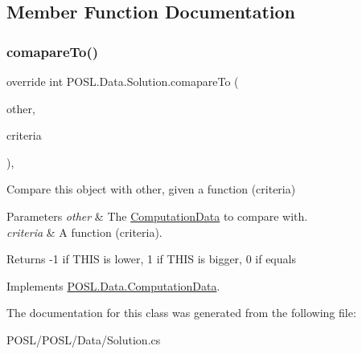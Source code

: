 \subsection{Member Function Documentation}
\mbox{\label{classPOSL_1_1Data_1_1Solution_a17d810433104964cc43bf65f35d25cc7}} 
\subsubsection{\texorpdfstring{comapare\+To()}{comapareTo()}}
{\footnotesize\ttfamily override int P\+O\+S\+L.\+Data.\+Solution.\+comapare\+To (\begin{DoxyParamCaption}\item[{\hyperlink{classPOSL_1_1Data_1_1ComputationData}{Computation\+Data}}]{other,  }\item[{Func$<$ \hyperlink{classPOSL_1_1Data_1_1ComputationData}{Computation\+Data}, int $>$}]{criteria }\end{DoxyParamCaption})\hspace{0.3cm}{\ttfamily [inline]}, {\ttfamily [virtual]}}



Compare this object with other, given a function (criteria) 


\begin{DoxyParams}{Parameters}
{\em other} & The \hyperlink{classPOSL_1_1Data_1_1ComputationData}{Computation\+Data} to compare with. \\
\hline
{\em criteria} & A function (criteria). \\
\hline
\end{DoxyParams}
\begin{DoxyReturn}{Returns}
-\/1 if T\+H\+IS is lower, 1 if T\+H\+IS is bigger, 0 if equals 
\end{DoxyReturn}


Implements \hyperlink{classPOSL_1_1Data_1_1ComputationData_a6cca889bb4ce32104d91dba413ef8c56}{P\+O\+S\+L.\+Data.\+Computation\+Data}.



The documentation for this class was generated from the following file\+:\begin{DoxyCompactItemize}
\item 
P\+O\+S\+L/\+P\+O\+S\+L/\+Data/Solution.\+cs\end{DoxyCompactItemize}
